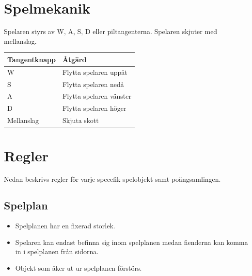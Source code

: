 \documentclass{TDP005mall}
\begin{document}
\section{Spelmekanik}
Spelaren styrs av W, A, S, D eller piltangenterna. Spelaren skjuter med mellanslag.
\begin{table}[!h]
\begin{tabularx}{\linewidth}{|X|X|}
\hline
Tangentknapp & Åtgärd\\\hline
W & Flytta spelaren uppåt\\\hline
S & Flytta spelaren nedå\\\hline
A & Flytta spelaren vänster\\\hline
D & Flytta spelaren höger\\\hline
Mellanslag & Skjuta skott\\\hline

\end{tabularx}
\end{table}

\section{Regler}
Nedan beskrivs regler för varje specefik spelobjekt samt poängsamlingen. 
\subsection{Spelplan}
\begin{itemize}
\item Spelplanen har en fixerad storlek.
\item Spelaren kan endast befinna sig inom spelplanen medan fienderna kan komma in i spelplanen från sidorna. 
\item Objekt som åker ut ur spelplanen förstörs.
\end{itemize}
\end{document}
